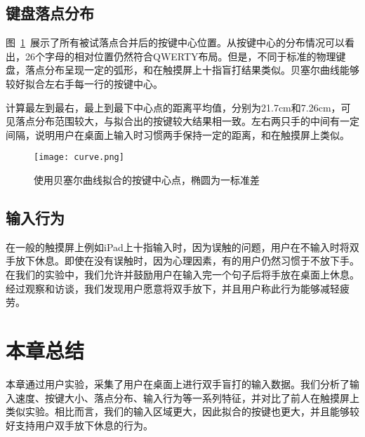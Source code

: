 
\subsection{键盘落点分布}
图~\ref{fig:keyboard-curve}~展示了所有被试落点合并后的按键中心位置。从按键中心的分布情况可以看出，26个字母的相对位置仍然符合QWERTY布局。但是，不同于标准的物理键盘，落点分布呈现一定的弧形，和在触摸屏上十指盲打结果类似\cite{flatglass2011findlater}\cite{2018shitoast}。贝塞尔曲线能够较好拟合左右手每一行的按键中心。

计算最左到最右，最上到最下中心点的距离平均值，分别为21.7cm和7.26cm，可见落点分布范围较大，与拟合出的按键较大结果相一致。左右两只手的中间有一定间隔，说明用户在桌面上输入时习惯两手保持一定的距离，和在触摸屏上类似\cite{flatglass2011findlater}。
\begin{figure}[h]
  \centering
  \texttt{[image: curve.png]}
  \caption{使用贝塞尔曲线拟合的按键中心点，椭圆为一标准差}
  \label{fig:keyboard-curve}
\end{figure}

\subsection{输入行为}
在一般的触摸屏上例如iPad上十指输入时，因为误触的问题，用户在不输入时将双手放下休息。即使在没有误触时，因为心理因素，有的用户仍然习惯于不放下手\cite{palmboard2020}。在我们的实验中，我们允许并鼓励用户在输入完一个句子后将手放在桌面上休息。经过观察和访谈，我们发现用户愿意将双手放下，并且用户称此行为能够减轻疲劳。

\section{本章总结}
本章通过用户实验，采集了用户在桌面上进行双手盲打的输入数据。我们分析了输入速度、按键大小、落点分布、输入行为等一系列特征，并对比了前人在触摸屏上类似实验。相比而言，我们的输入区域更大，因此拟合的按键也更大，并且能够较好支持用户双手放下休息的行为。